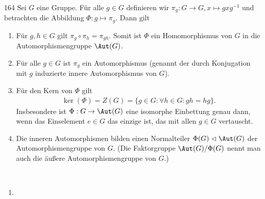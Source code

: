 \begin{algebraUE}{164}
Sei $G$ eine Gruppe. Für alle $g \in G$ definieren wir $\pi_g: G \rightarrow G, x \mapsto gxg^{-1}$
und betrachten die Abbildung $\Phi: g \mapsto \pi_g$. Dann gilt
\begin{enumerate}
  \item Für $g,h \in G$ gilt $\pi_g \circ \pi_h = \pi_{gh}$. Somit ist $\Phi$
  ein Homomorphismus von $G$ in die Automorphismengruppe $\Aut(G)$.
  \item Für alle $g \in G$ ist $\pi_g$ ein Automorphismus (genannt der durch
  Konjugation mit $g$ induzierte innere Automorphismus von $G$).
  \item Für den Kern von $\Phi$ gilt
  \begin{align*}
    \ker(\Phi) = Z(G) = \{g \in G: \forall h \in G: gh = hg\}.
  \end{align*}
  Insbesondere ist $\Phi: G \rightarrow \Aut(G)$ eine isomorphe Einbettung genau dann,
  wenn das Einselement $e \in G$ das einzige ist, das mit allen $g \in G$ vertauscht.
  \item Die inneren Automorphismen bilden einen Normalteiler $\Phi(G) \vartriangleleft \Aut(G)$
  der Automorphismengruppe von $G$. (Die Faktorgruppe $\Aut(G)/\Phi(G)$ nennt man
  auch die äußere Automorphismengruppe von $G$.)
\end{enumerate}
\end{algebraUE}
\begin{solution}
\leavevmode \\
\begin{enumerate}
  \item
\end{enumerate}

\end{solution}
